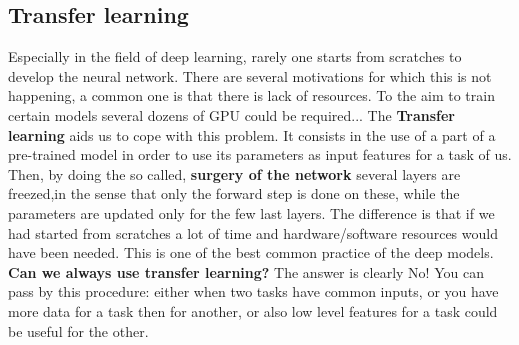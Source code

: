 \subsection{Transfer learning}
Especially in the field of deep learning, rarely one starts from scratches to develop the neural network. There are several motivations for which this is not happening, a common one is that there is lack of resources. To the aim to train certain models several dozens of GPU could be required... The \textbf{Transfer learning} aids us to cope with this problem. It consists in the use of a part of a pre-trained model in order to use its parameters as input features for a task of us. Then, by doing the so called, \textbf{surgery of the network} several layers are freezed,in the sense that only the forward step is done on these, while the parameters are updated only for the few last layers. The difference is that if we had started from scratches a lot of time and hardware/software resources would have been needed. This is one of the best common practice of the deep models.\\
\textbf{Can we always use transfer learning?} The answer is clearly No! You can pass by this procedure: either when two tasks have common inputs, or you have more data for a task then for another, or also low level features for a task could be useful for the other.